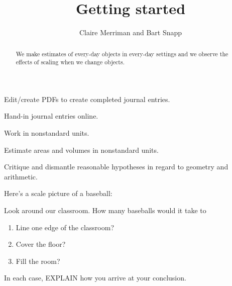\documentclass[handout,noauthor,nooutcomes,hints,12pt]{ximera}
\title{Getting started}
\author{Claire Merriman and Bart Snapp}
\begin{document}
\begin{abstract}
  We make estimates of every-day objects in every-day settings and we
  observe the effects of scaling when we change objects.
\end{abstract}
\maketitle



\begin{listOutcomes}
\item{Edit/create PDFs to create completed journal entries.}
\item{Hand-in journal entries online.}
\item{Work in nonstandard units.}
\item{Estimate areas and volumes in nonstandard units.}
\item{Critique and dismantle reasonable hypotheses in regard to geometry and arithmetic.}
\end{listOutcomes}

\mynewpage


\begin{question}
  Here's a scale picture of a baseball:
  \begin{center}
  \end{center}
Look around our classroom. How many baseballs would it take to
\begin{enumerate}
\item Line one edge of the classroom?
 \item Cover the floor?
 \item Fill the room?
\end{enumerate}
In each case, EXPLAIN how you arrive at your conclusion.
\end{question}
\mynewpage
\end{document}

